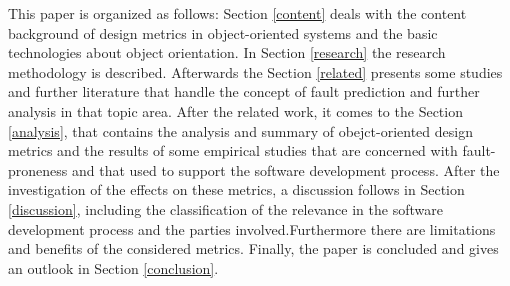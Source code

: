 This paper is organized as follows: Section \ref{content} deals with the content background of design metrics in object-oriented systems and the basic technologies about object orientation. In Section \ref{research} the research methodology is described. Afterwards the Section \ref{related} presents some studies and further literature that handle the concept of fault prediction and further analysis in that topic area. After the related work, it comes to the Section \ref{analysis}, that contains the analysis and summary of obejct-oriented design metrics and the results of some empirical studies that are concerned with fault-proneness and that used to support the software development process. After the investigation of the effects on these metrics, a discussion follows in Section \ref{discussion}, including the classification of the relevance in the software development process and the parties involved.Furthermore there are limitations and benefits of the considered metrics. Finally, the paper is concluded and gives an outlook in Section \ref{conclusion}.